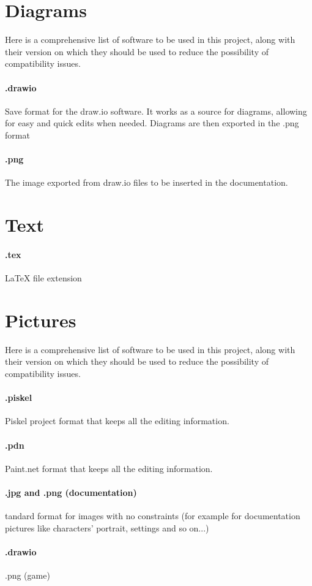 \section{Diagrams}
Here is a comprehensive list of software to be used in this project, along with their version on which they should be used to reduce the possibility of compatibility issues.
\paragraph{.drawio}
Save format for the draw.io software. It works as a source for diagrams, allowing for easy and quick edits when needed. Diagrams are then exported in the .png format
\paragraph{.png}
The image exported from draw.io files to be inserted in the documentation.

\section{Text}
\paragraph{.tex}
LaTeX file extension

\section{Pictures}
Here is a comprehensive list of software to be used in this project, along with their version on which they should be used to reduce the possibility of compatibility issues.
\paragraph{.piskel} Piskel project format that keeps all the editing information.
\paragraph{.pdn} Paint.net format that keeps all the editing information.
\paragraph{.jpg and .png (documentation)} tandard format for images with no constraints (for example for documentation pictures like characters' portrait, settings and so on...)
\paragraph{.drawio} .png (game) \\

